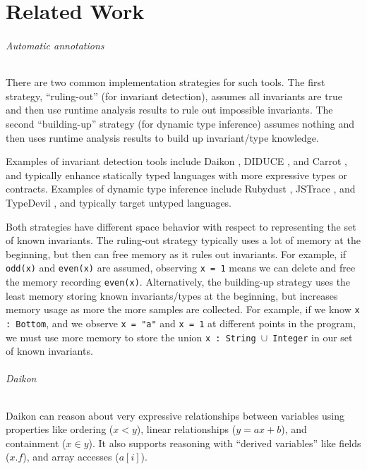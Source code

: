 \documentclass[11pt]{iuthesis}
\begin{document}




\part{Related Work}



%

\paragraph{Automatic annotations}
There are two common implementation strategies for such tools. The first
strategy, ``ruling-out'' (for invariant detection), assumes all invariants are true 
and then use runtime analysis results to rule out
impossible invariants. The second ``building-up'' strategy (for dynamic type inference)
assumes nothing and then uses runtime analysis results to build up invariant/type knowledge.

Examples of invariant detection tools include Daikon \cite{Ernst06thedaikon},
DIDUCE \cite{hangal2002tracking}, and Carrot \cite{pytlik2003automated}, and
typically enhance statically typed languages with more expressive types or contracts.
Examples of dynamic type inference include Rubydust \cite{An10dynamicinference},
JSTrace \cite{saftoiu2010jstrace}, and TypeDevil \cite{pradel2015typedevil},
and typically target untyped languages.

Both strategies have different space behavior with respect to representing
the set of known invariants.
The ruling-out strategy typically uses a lot of memory at the beginning,
but then can free memory as it rules out invariants. For example, if
\texttt{odd(x)} and \texttt{even(x)} are assumed, observing \texttt{x = 1}
means we can delete and free the memory recording \texttt{even(x)}.
Alternatively, the building-up strategy uses the least memory storing
known invariants/types at the beginning, but increases memory usage
as more the more samples are collected. For example, if we know
\texttt{x : Bottom}, and we observe \texttt{x = "a"} and \texttt{x = 1}
at different points in the program, we must use more memory to
store the union \texttt{x : String $\cup$ Integer} in our set of known invariants.

\paragraph{Daikon}
Daikon can reason about very expressive relationships between variables
using properties like ordering ($x < y$), linear relationships ($y = ax + b$),
and containment ($x \in y$). It also supports reasoning with ``derived variables''
like fields ($x.f$), and array accesses ($a[i]$).
\end{document}
